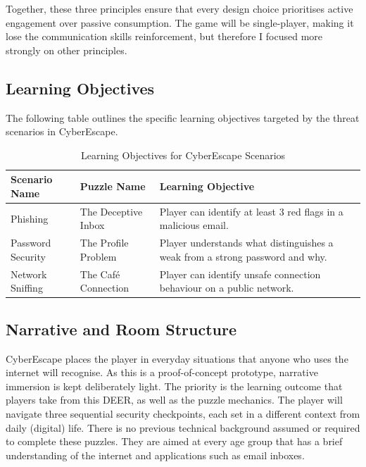 \documentclass[sigconf, authorversion=true, nonacm=true]{acmart}%
\begin{document}
Together, these three principles ensure that every design choice prioritises active engagement over passive consumption. The game will be single-player, making it lose the communication skills reinforcement, but therefore I focused more strongly on other principles. 




\subsection{Learning Objectives}

The following table outlines the specific learning objectives targeted by the threat scenarios in CyberEscape.

\begin{table}[h!]
\centering
\begin{tabular}{|p{2cm}|p{2cm}|p{4cm}|}
\hline
\textbf{Scenario Name} & \textbf{Puzzle Name} & \textbf{Learning Objective} \\
\hline
Phishing & The Deceptive Inbox & Player can identify at least 3 red flags in a malicious email. \\
\hline
Password Security & The Profile Problem & Player understands what distinguishes a weak from a strong password and why. \\
\hline
Network Sniffing & The Café Connection & Player can identify unsafe connection behaviour on a public network. \\
\hline
\end{tabular}
\caption{Learning Objectives for CyberEscape Scenarios}
\end{table}


\subsection{Narrative and Room Structure}

CyberEscape places the player in everyday situations that anyone who uses the internet will recognise. As this is a proof-of-concept prototype, narrative immersion is kept deliberately light. The priority is the learning outcome that players take from this DEER, as well as the puzzle mechanics. The player will navigate three sequential security checkpoints, each set in a different context from daily (digital) life. There is no previous technical background assumed or required to complete these puzzles. They are aimed at every age group that has a brief understanding of the internet and applications such as email inboxes.
\end{document}
